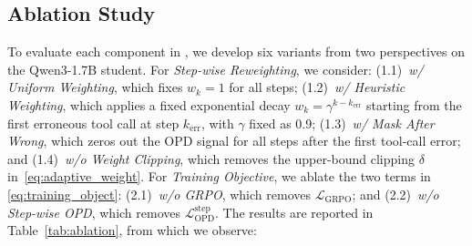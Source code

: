 








\subsection{Ablation Study}



To evaluate each component in \ourmodel, we develop six variants from two perspectives on the Qwen3-1.7B student. For \textit{Step-wise Reweighting}, we consider: (1.1)~\textit{w/ Uniform Weighting}, which fixes $w_k=1$ for all steps; (1.2)~\textit{w/ Heuristic Weighting}, which applies a fixed exponential decay $w_k = \gamma^{k - k_{\mathrm{err}}}$ starting from the first erroneous tool call at step $k_{\mathrm{err}}$, with $\gamma$ fixed as 0.9; (1.3)~\textit{w/ Mask After Wrong}, which zeros out the OPD signal for all steps after the first tool-call error; and (1.4)~\textit{w/o Weight Clipping}, which removes the upper-bound clipping $\delta$ in~\cref{eq:adaptive_weight}. For \textit{Training Objective}, we ablate the two terms in \cref{eq:training_object}: (2.1)~\textit{w/o GRPO}, which removes $\mathcal{L}_{\mathrm{GRPO}}$; and (2.2)~\textit{w/o Step-wise OPD}, which removes $\mathcal{L}_{\mathrm{OPD}}^{\mathrm{step}}$. The results are reported in Table~\ref{tab:ablation}, from which we observe:



